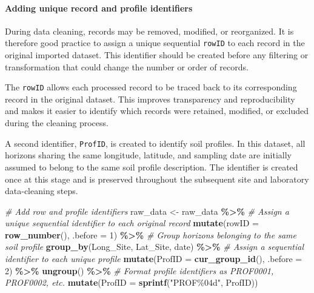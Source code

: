 \documentclass[
  10pt,
  b5paper,
  oneside]{book}
\newenvironment{Shaded}{\begin{snugshade}}{\end{snugshade}}
\newcommand{\AttributeTok}[1]{\textcolor[rgb]{0.13,0.29,0.53}{#1}}
\newcommand{\CommentTok}[1]{\textcolor[rgb]{0.56,0.35,0.01}{\textit{#1}}}
\newcommand{\DecValTok}[1]{\textcolor[rgb]{0.00,0.00,0.81}{#1}}
\newcommand{\FunctionTok}[1]{\textcolor[rgb]{0.13,0.29,0.53}{\textbf{#1}}}
\newcommand{\NormalTok}[1]{#1}
\newcommand{\OtherTok}[1]{\textcolor[rgb]{0.56,0.35,0.01}{#1}}
\newcommand{\SpecialCharTok}[1]{\textcolor[rgb]{0.81,0.36,0.00}{\textbf{#1}}}
\newcommand{\StringTok}[1]{\textcolor[rgb]{0.31,0.60,0.02}{#1}}
\begin{document}
\paragraph{Adding unique record and profile identifiers}\label{adding-unique-record-and-profile-identifiers}

During data cleaning, records may be removed, modified, or reorganized. It is therefore good practice to assign a unique sequential \texttt{rowID} to each record in the original imported dataset. This identifier should be created before any filtering or transformation that could change the number or order of records.

The \texttt{rowID} allows each processed record to be traced back to its corresponding record in the original dataset. This improves transparency and reproducibility and makes it easier to identify which records were retained, modified, or excluded during the cleaning process.

A second identifier, \texttt{ProfID}, is created to identify soil profiles. In this dataset, all horizons sharing the same longitude, latitude, and sampling date are initially assumed to belong to the same soil profile description. The identifier is created once at this stage and is preserved throughout the subsequent site and laboratory data-cleaning steps.

\begin{Shaded}
\begin{Highlighting}[]
\CommentTok{\# Add row and profile identifiers}
\NormalTok{raw\_data }\OtherTok{\textless{}{-}}\NormalTok{ raw\_data }\SpecialCharTok{\%\textgreater{}\%}
  \CommentTok{\# Assign a unique sequential identifier to each original record}
  \FunctionTok{mutate}\NormalTok{(}\AttributeTok{rowID =} \FunctionTok{row\_number}\NormalTok{(), }\AttributeTok{.before =} \DecValTok{1}\NormalTok{) }\SpecialCharTok{\%\textgreater{}\%}
  \CommentTok{\# Group horizons belonging to the same soil profile}
  \FunctionTok{group\_by}\NormalTok{(Long\_Site, Lat\_Site, date) }\SpecialCharTok{\%\textgreater{}\%}
  \CommentTok{\# Assign a sequential identifier to each unique profile}
  \FunctionTok{mutate}\NormalTok{(}\AttributeTok{ProfID =} \FunctionTok{cur\_group\_id}\NormalTok{(), }\AttributeTok{.before =} \DecValTok{2}\NormalTok{) }\SpecialCharTok{\%\textgreater{}\%}
  \FunctionTok{ungroup}\NormalTok{() }\SpecialCharTok{\%\textgreater{}\%}
  \CommentTok{\# Format profile identifiers as PROF0001, PROF0002, etc.}
  \FunctionTok{mutate}\NormalTok{(}\AttributeTok{ProfID =} \FunctionTok{sprintf}\NormalTok{(}\StringTok{"PROF\%04d"}\NormalTok{, ProfID))}
\end{Highlighting}
\end{Shaded}
\end{document}
